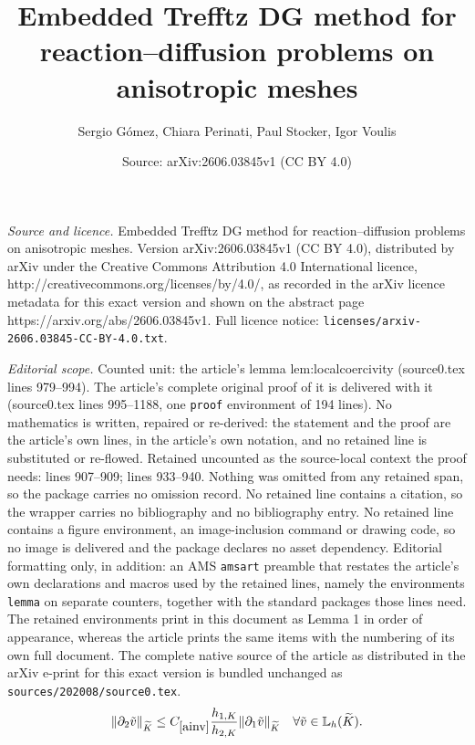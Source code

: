 \documentclass[10pt,a4paper]{amsart}
\title{Embedded Trefftz DG method for reaction--diffusion problems on anisotropic meshes}
\author{Sergio G\'omez, Chiara Perinati, Paul Stocker, Igor Voulis}
\date{Source: arXiv:2606.03845v1 (CC BY 4.0)}
\newcommand{\IL}{\mathbb{L}}
\newcommand{\Kt}{\widetilde{K}}
\newcommand{\const}[1]{C_{\eqref{#1}}}
\newcommand{\hKot}{h_{1,K}}
\newcommand{\hKtt}{h_{2,K}}
\begin{document}
\maketitle

\noindent\emph{Source and licence.} Embedded Trefftz DG method for reaction--diffusion problems on anisotropic meshes. Version arXiv:2606.03845v1 (CC BY 4.0), distributed by arXiv under the Creative Commons Attribution 4.0 International licence, http://creativecommons.org/licenses/by/4.0/, as recorded in the arXiv licence metadata for this exact version and shown on the abstract page https://arxiv.org/abs/2606.03845v1. Full licence notice: \texttt{licenses/arxiv-2606.03845-CC-BY-4.0.txt}.\par\smallskip

\noindent\textit{Editorial scope.} Counted unit: the article's lemma lem:localcoercivity (source0.tex lines 979--994). The article's complete original proof of it is delivered with it (source0.tex lines 995--1188, one \texttt{proof} environment of 194 lines). No mathematics is written, repaired or re-derived: the statement and the proof are the article's own lines, in the article's own notation, and no retained line is substituted or re-flowed.  Retained uncounted as the source-local context the proof needs: lines 907--909; lines 933--940.  Nothing was omitted from any retained span, so the package carries no omission record.  No retained line contains a citation, so the wrapper carries no bibliography and no bibliography entry.  No retained line contains a figure environment, an image-inclusion command or drawing code, so no image is delivered and the package declares no asset dependency.  Editorial formatting only, in addition: an AMS \texttt{amsart} preamble that restates the article's own declarations and macros used by the retained lines, namely the environments \texttt{lemma} on separate counters, together with the standard packages those lines need.  The retained environments print in this document as Lemma 1 in order of appearance, whereas the article prints the same items with the numbering of its own full document.  The complete native source of the article as distributed in the arXiv e-print for this exact version is bundled unchanged as \texttt{sources/202008/source0.tex}.
	\begin{equation}\label{ainv}
	    \|\partial_2 \tilde v\|_{\Kt} \leq \const{ainv} \frac{\hKot}{\hKtt} \|\partial_1 \tilde v\|_{\Kt} \quad \forall \tilde v \in \IL_h(\Kt).
	\end{equation}
\end{document}
